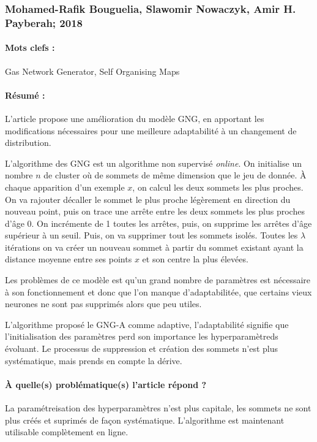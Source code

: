 \documentclass[11pt,a4paper]{report}
\begin{document}
\subsubsection{Mohamed-Rafik Bouguelia, Slawomir Nowaczyk, Amir H. Payberah; 2018}

\paragraph{Mots clefs :}Gas Network Generator, Self Organising Maps

\paragraph{Résumé :}L'article propose une amélioration du modèle GNG, en apportant les modifications nécessaires pour une meilleure adaptabilité à un changement de distribution.

L'algorithme des GNG est un algorithme non supervisé \textit{online}. On initialise un nombre $n$ de cluster où de sommets de même dimension que le jeu de donnée. À chaque apparition d'un exemple $x$, on calcul les deux sommets les plus proches. On va rajouter décaller le sommet le plus proche légèrement en direction du nouveau point, puis on trace une arrête entre les deux sommets les plus proches d'âge 0. On incrémente de 1 toutes les arrêtes, puis, on supprime les arrêtes d'âge supérieur à un seuil. Puis, on va supprimer tout les sommets isolés. Toutes les $\lambda$ itérations on va créer un nouveau sommet à partir du sommet existant ayant la distance moyenne entre ses points $x$ et son centre la plus élevées.

Les problèmes de ce modèle est qu'un grand nombre de paramètres est nécessaire à son fonctionnement et donc que l'on manque d'adaptabilitée, que certains vieux neurones ne sont pas supprimés alors que peu utiles.

L'algorithme proposé le GNG-A comme adaptive, l'adaptabilité signifie que l'initialisation des paramètres perd son importance les hyperparamètreds évoluant. Le processus de suppression et création des sommets n'est plus systématique, mais prends en compte la dérive. 

\paragraph{À quelle(s) problématique(s) l'article répond ? } La paramétreisation des hyperparamètres n'est plus capitale, les sommets ne sont plus créés et suprimés de façon systématique. L'algorithme est maintenant utilisable complètement en ligne.
\end{document}
